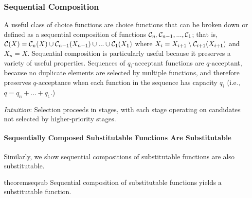 \subsubsection{Sequential Composition} \label{sec:seq-proofs}
A useful class of choice functions are choice functions that can be broken down or defined as a sequential composition of functions $\mathcal{C}_n, \mathcal{C}_{n-1}, ..., \mathcal{C}_1$; that is,
$\mathcal{C}(X) = \mathcal{C}_n(X) \cup \mathcal{C}_{n-1}(X_{n-1}) \cup ... \cup \mathcal{C}_1(X_1)$ where $X_i = X_{i+1} \setminus\mathcal{C}_{i+1}(X_{i+1})$ and $X_n = X$. Sequential composition is particularly useful because it preserves a variety of useful properties. Sequences of $q_i$-acceptant functions are $q$-acceptant, because no duplicate elements are selected by multiple functions, and therefore preserves $q$-acceptance when each function in the sequence has capacity $q_i$ (i.e., $q = q_n + ... + q_1$.)
\seqcomposition*

\textit{Intuition}: Selection proceeds in stages, with each stage operating on candidates not selected by higher-priority stages.

\paragraph{Sequentially Composed Substitutable Functions Are Substitutable}
Similarly, we show sequential compositions of substitutable functions are also substitutable.
\begin{restatable}{theorem}{seqsub}
\label{thm:composition-substitutable}
Sequential composition of substitutable functions yields a substitutable function.
\end{restatable}

